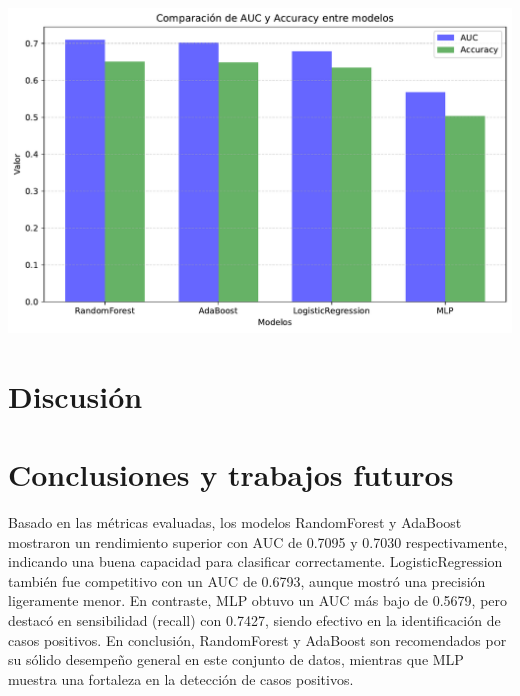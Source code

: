 \documentclass[
  number,
  preprint,
  3p,
  twocolumn]{elsarticle}
\begin{document}
\includegraphics{Articulo_v2_files/figure-pdf/cell-7-output-1.pdf}

\section{Discusión}\label{discusiuxf3n}

\section{Conclusiones y trabajos
futuros}\label{conclusiones-y-trabajos-futuros}

Basado en las métricas evaluadas, los modelos RandomForest y AdaBoost
mostraron un rendimiento superior con AUC de 0.7095 y 0.7030
respectivamente, indicando una buena capacidad para clasificar
correctamente. LogisticRegression también fue competitivo con un AUC de
0.6793, aunque mostró una precisión ligeramente menor. En contraste, MLP
obtuvo un AUC más bajo de 0.5679, pero destacó en sensibilidad (recall)
con 0.7427, siendo efectivo en la identificación de casos positivos. En
conclusión, RandomForest y AdaBoost son recomendados por su sólido
desempeño general en este conjunto de datos, mientras que MLP muestra
una fortaleza en la detección de casos positivos.


\renewcommand\refname{References}
  
\end{document}
